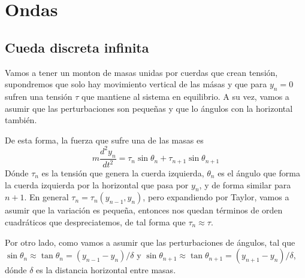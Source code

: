 \chapter{Ondas}
\section{Cueda discreta infinita}
Vamos a tener un monton de masas unidas por cuerdas que crean tensión, supondremos que solo hay movimiento vertical de las másas y que para $y_n = 0$ sufren una tensión $\tau$ que mantiene al sistema en equilibrio. A su vez, vamos a asumir que las perturbaciones son pequeñas y que lo ángulos con la horizontal también.

De esta forma, la fuerza que sufre una de las masas es 
\begin{equation} \label{6.1.1}
    m \frac{d^2 y_n}{dt^2} = \tau_n \sin\theta_n + \tau_{n+1} \sin\theta_{n+1}
\end{equation}
Dónde $\tau_n$ es la tensión que genera la cuerda izquierda, $\theta_n$ es el ángulo que forma la cuerda izquierda por la horizontal que pasa por $y_n$, y de forma similar para $n+1$. En general $\tau_n = \tau_n (y_{n-1},y_n)$, pero expandiendo por Taylor, vamos a asumir que la variación es pequeña, entonces nos quedan términos de orden cuadráticos que despreciatemos, de tal forma que $\tau_n \approx \tau$.

Por otro lado, como vamos a asumir que las perturbaciones de ángulos, tal que $\sin\theta_n \approx \tan\theta_n = (y_{n-1}-y_n)/\delta$ y $\sin\theta_{n+1} \approx \tan\theta_{n+1} = (y_{n+1}-y_n)/\delta$, dónde $\delta$ es la distancia horizontal entre masas.

